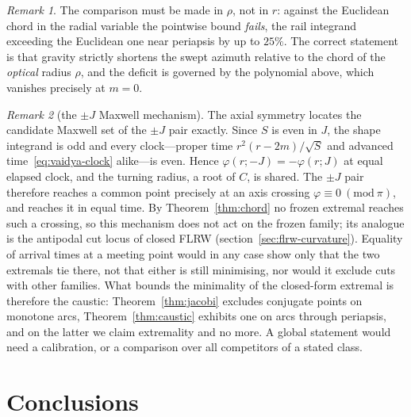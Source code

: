 \documentclass[12pt]{iopart}
\theoremstyle{plain}
\theoremstyle{definition}
\theoremstyle{plain}
\theoremstyle{remark}
\newtheorem*{remark}{Remark}
\begin{document}
\begin{remark}
The comparison must be made in $\rho$, not in $r$: against the Euclidean chord in the
radial variable the pointwise bound \emph{fails}, the rail integrand exceeding the
Euclidean one near periapsis by up to $25\%$. The correct statement is that gravity
strictly shortens the swept azimuth relative to the chord of the \emph{optical} radius
$\rho$, and the deficit is governed by the polynomial above, which vanishes precisely at
$m=0$.
\end{remark}

\begin{remark}[the $\pm J$ Maxwell mechanism]\label{rem:maxwell}
The axial symmetry locates the candidate Maxwell set of the $\pm J$ pair exactly.
Since $S$ is even in $J$, the shape integrand is odd and every clock---proper time
$r^2(r-2m)/\sqrt S$ and advanced time~\eqref{eq:vaidya-clock} alike---is even. Hence
$\varphi(r;-J)=-\varphi(r;J)$ at equal elapsed clock, and the turning radius, a root of
$C$, is shared. The $\pm J$ pair therefore reaches a common point precisely at an axis
crossing $\varphi\equiv0\ (\mathrm{mod}\ \pi)$, and reaches it in equal time. By
Theorem~\ref{thm:chord} no frozen extremal reaches such a crossing, so this mechanism does
not act on the frozen family; its analogue is the antipodal cut locus of closed FLRW
(section~\ref{sec:flrw-curvature}). Equality of arrival times at a meeting point would in
any case show only that the two extremals tie there, not that either is still minimising,
nor would it exclude cuts with other families. What bounds the minimality of the
closed-form extremal is therefore the caustic: Theorem~\ref{thm:jacobi} excludes conjugate
points on monotone arcs, Theorem~\ref{thm:caustic} exhibits one on arcs through periapsis,
and on the latter we claim extremality and no more. A global statement would need a
calibration, or a comparison over all competitors of a stated class.
\end{remark}

\section{Conclusions}
\label{sec:concl}
\end{document}
